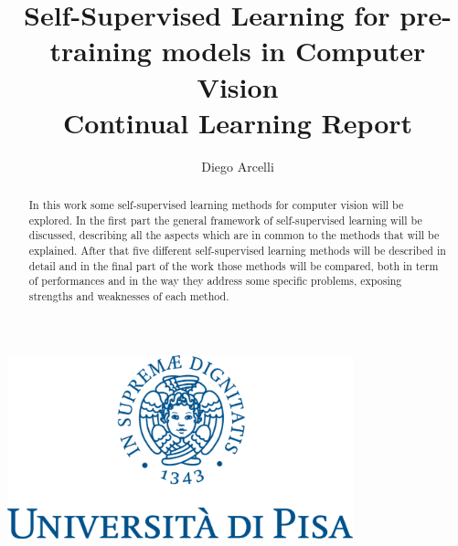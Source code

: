 \documentclass[12pt]{article}
\begin{document}
	
	\begin{titlepage}
		
		\title{Self-Supervised Learning for pre-training models in Computer Vision \\ \vspace{1cm} Continual Learning Report}
		\author{Diego Arcelli}
		\maketitle
		\centering
		\includegraphics[width=10cm]{./images/unipi_logo.png}
		
	\end{titlepage}
	
	\tableofcontents
	\newpage
	
	\begin{abstract}
	\noindent In this work some self-supervised learning methods for computer vision will be explored. In the first part the general framework of self-supervised learning will be discussed, describing all the aspects which are in common to the methods that will be explained. After that five different self-supervised learning methods will be described in detail and in the final part of the work those methods will be compared, both in term of performances and in the way they address some specific problems, exposing strengths and weaknesses of each method.
	\end{abstract}
	
\end{document}

